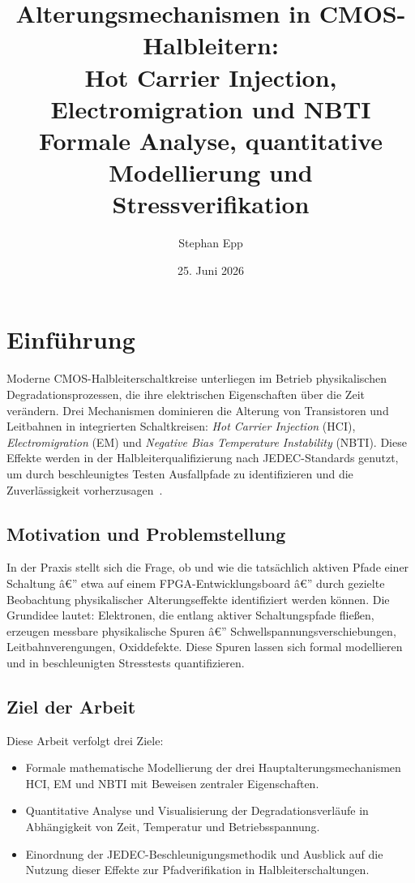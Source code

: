 ﻿\documentclass[a4paper,12pt]{article}
\title{Alterungsmechanismen in CMOS-Halbleitern:\\
Hot Carrier Injection, Electromigration und NBTI\\\large
Formale Analyse, quantitative Modellierung und Stressverifikation}
\author{Stephan Epp}
\date{25. Juni 2026}
\theoremstyle{definition}
\begin{document}
\sloppy
\setlength{\emergencystretch}{3em}

\maketitle
\tableofcontents
\newpage

\section{Einführung}

Moderne CMOS-Halbleiterschaltkreise unterliegen im Betrieb physikalischen
Degradationsprozessen, die ihre elektrischen Eigenschaften über die Zeit
verändern. Drei Mechanismen dominieren die Alterung von
Transistoren und Leitbahnen in integrierten Schaltkreisen:
\emph{Hot Carrier Injection} (HCI), \emph{Electromigration} (EM) und
\emph{Negative Bias Temperature Instability} (NBTI). Diese Effekte werden
in der Halbleiterqualifizierung nach JEDEC-Standards genutzt, um durch
beschleunigtes Testen Ausfallpfade zu identifizieren und die Zuverlässigkeit
vorherzusagen~\cite{jedec2010,black1969,takeda1983}.

\subsection{Motivation und Problemstellung}

In der Praxis stellt sich die Frage, ob und wie die tatsächlich aktiven Pfade
einer Schaltung â€” etwa auf einem FPGA-Entwicklungsboard â€” durch gezielte
Beobachtung physikalischer Alterungseffekte identifiziert werden können.
Die Grundidee lautet: Elektronen, die entlang aktiver Schaltungspfade fließen,
erzeugen messbare physikalische Spuren â€” Schwellspannungsverschiebungen,
Leitbahnverengungen, Oxiddefekte. Diese Spuren lassen sich formal modellieren
und in beschleunigten Stresstests quantifizieren.

\subsection{Ziel der Arbeit}

Diese Arbeit verfolgt drei Ziele:
\begin{itemize}
	\item Formale mathematische Modellierung der drei Hauptalterungsmechanismen
	      HCI, EM und NBTI mit Beweisen zentraler Eigenschaften.
	\item Quantitative Analyse und Visualisierung der Degradationsverläufe
	      in Abhängigkeit von Zeit, Temperatur und Betriebsspannung.
	\item Einordnung der JEDEC-Beschleunigungsmethodik und Ausblick auf
	      die Nutzung dieser Effekte zur Pfadverifikation in Halbleiterschaltungen.
\end{itemize}
\end{document}
